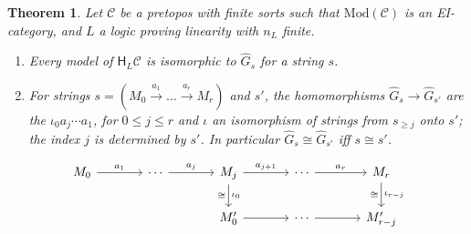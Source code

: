 \documentclass[11pt]{amsart}
\newtheorem{thm}{Theorem}[section]
\theoremstyle{definition}
\newcommand{\Mod}{\mathrm{Mod}}
\newcommand{\HH}{\mathsf H}
\newcommand{\cC}{\mathcal C}
\begin{document}
\begin{thm}\label{thm:strings}
Let $\cC$ be a pretopos with finite sorts such that $\Mod(\cC)$ is an
EI-category, and $L$ a logic proving linearity with $n_L$ finite.
\begin{enumerate}
\item[(a)] Every model of $\HH_L\cC$ is isomorphic to $\hat G_s$ for a
string $s$.
\item[(b)] For strings $s=(M_0\xrightarrow{a_1}\dots\xrightarrow{a_r}
M_r)$ and $s'$, the homomorphisms $\hat G_s\to\hat G_{s'}$ are the
$\iota_0a_j\cdots a_1$, for $0\le j\le r$ and $\iota$ an isomorphism
of strings from $s_{\ge j}$ onto $s'$; the index $j$ is determined by
$s'$. In particular $\hat G_s\cong\hat G_{s'}$ iff $s\cong s'$.
\end{enumerate}
\end{thm}
\[
\begin{tikzcd}[column sep=large]
M_0\ar[r,"a_1"]&\cdots\ar[r,"a_j"]&M_j\ar[r,"a_{j+1}"]\ar[d,"\iota_0",
"\cong"']&\cdots\ar[r,"a_r"]&M_r\ar[d,"\iota_{r-j}","\cong"']\\
&&M'_0\ar[r]&\cdots\ar[r]&M'_{r-j}
\end{tikzcd}
\]
\end{document}
